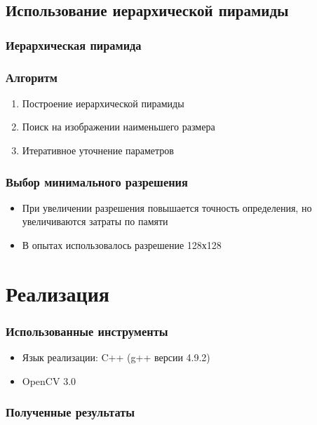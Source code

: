 \documentclass[14pt]{beamer}
\begin{document}
\subsection{Использование иерархической пирамиды}
\begin{frame}
\frametitle{Иерархическая пирамида}

\end{frame}

\begin{frame}
\frametitle{Алгоритм}
\begin{enumerate}
  \item Построение иерархической пирамиды
  \item Поиск на изображении наименьшего размера
  \item Итеративное уточнение параметров
\end{enumerate}
\end{frame}

\begin{frame}
\frametitle{Выбор минимального разрешения}
\begin{itemize}
  \item При увеличении разрешения повышается точность определения, но увеличиваются затраты по памяти
  \item В опытах использовалось разрешение 128х128
\end{itemize}
\end{frame}

\section{Реализация}
\begin{frame}
\frametitle{Использованные инструменты}
\begin{itemize}
  \item Язык реализации: C++ (g++ версии 4.9.2)
  \item OpenCV 3.0
\end{itemize}
\end{frame}

\begin{frame}
\frametitle{Полученные результаты}

\end{frame}
\end{document}
